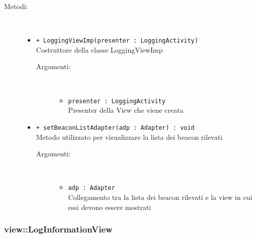 \documentclass[../DefinizioneDiProdotto.tex]{subfiles}
\begin{document}
\begin{description}
\begin{itemize}
\end{itemize}
\item[Metodi:] \
\begin{itemize}
\item \texttt{+ LoggingViewImp(presenter : LoggingActivity)}\\
Costruttore della classe LoggingViewImp
 \begin{description}
\item[Argomenti:] \
\begin{itemize}
\item \texttt{presenter : LoggingActivity}\\
Presenter della View che viene creata\end{itemize}
\end{description}
\item \texttt{+ setBeaconListAdapter(adp : Adapter) : void}\\
Metodo utilizzato per visualizzare la lista dei beacon rilevati 
 \begin{description}
\item[Argomenti:] \
\begin{itemize}
\item \texttt{adp : Adapter}\\
Collegamento tra la lista dei beacon rilevati e la view in cui essi devono essere mostrati\end{itemize}
\end{description}
\end{itemize}
\end{description}

\subsubsection{view::LogInformationView}
\end{document}
